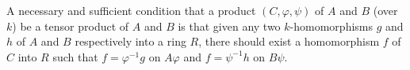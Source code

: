 A necessary and sufficient condition that a product $(C, \varphi, \psi)$ of $A$ and $B$ (over $k$) be a tensor product of $A$ and $B$ is that given any two $k$-homomorphisms $g$ and $h$ of $A$ and $B$ respectively into a ring $R$, there should exist a homomorphism $f$ of $C$ into $R$ such that $f = \varphi^{-1}g$ on $A\varphi$ and $f = \psi^{-1}h$ on $B\psi$.
